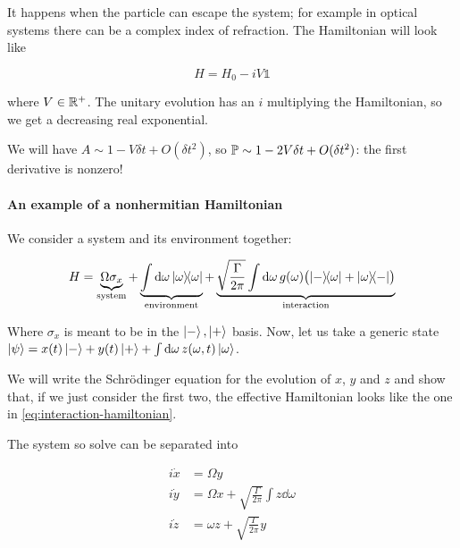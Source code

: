 \documentclass[main.tex]{subfiles}
\begin{document}
It happens when the particle can escape the system; for example in optical systems there can be a complex index of refraction. The Hamiltonian will look like

\begin{equation}
    H = H_0 - iV \mathbb 1
\end{equation}

where \(V \in \R^+\). The unitary evolution has an \(i\) multiplying the Hamiltonian, so we get a decreasing real exponential.

We will have \(A \sim 1 -V \delta t + O(\delta t^2)\), so \(\P  \sim 1 - 2V \delta t + O(\delta t^2)\): the first derivative is nonzero!

\paragraph{An example of a nonhermitian Hamiltonian}

We consider a system and its environment together:

\begin{equation}
    H = \underbrace{\Omega \sigma_x}_{\substack{\text{system}}}  + \underbrace{\int   \dd{\omega} \dyad{\omega}}_{\substack{\text{environment}}} + \underbrace{\sqrt{\frac{\Gamma}{2 \pi}} \int   \dd{\omega} g(\omega) \qty(\ketbra{-}{\omega} + \ketbra{\omega}{-}  )  }_{\substack{\text{interaction}}}
\end{equation}

Where \(\sigma_x\) is meant to be in the \(\ket{-}, \ket{+}  \) basis. Now, let us take a generic state \(\ket{\psi } = x(t) \ket{-} + y(t) \ket{+} + \int \dd{\omega} z(\omega, t) \ket{\omega} \).

We will write the Schrödinger equation for the evolution of \(x\), \(y\) and \(z\) and show that, if we just consider the first two, the effective Hamiltonian looks like the one in \eqref{eq:interaction-hamiltonian}.

The system so solve can be separated into

\begin{subequations}
\begin{align}
  i \dot{x} &= \Omega y \\
  i \dot{y} &= \Omega x +\sqrt{\frac{\Gamma}{2 \pi}} \int z \dd{\omega}   \\
  i \dot{z} &= \omega z +\sqrt{\frac{\Gamma}{2 \pi}} y
\end{align}
\end{subequations}
\end{document}
